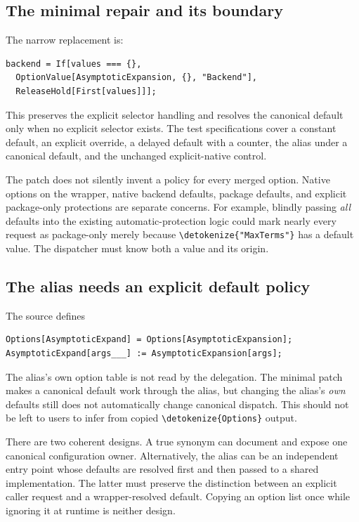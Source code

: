 \documentclass[11pt,a4paper]{article}
\newcommand{\wl}[1]{\texttt{\expandafter\nolinkurl\expandafter{\detokenize{#1}}}}
\begin{document}
\subsection{The minimal repair and its boundary}

The narrow replacement is:
\begin{lstlisting}
backend = If[values === {},
  OptionValue[AsymptoticExpansion, {}, "Backend"],
  ReleaseHold[First[values]]];
\end{lstlisting}
This preserves the explicit selector handling and resolves the canonical default
only when no explicit selector exists. The test specifications cover a constant
default, an explicit override, a delayed default with a counter, the alias under
a canonical default, and the unchanged explicit-native control.

The patch does not silently invent a policy for every merged option. Native
options on the wrapper, native backend defaults, package defaults, and explicit
package-only protections are separate concerns. For example, blindly passing
\emph{all} defaults into the existing automatic-protection logic could mark
nearly every request as package-only merely because \wl{"MaxTerms"} has a
default value. The dispatcher must know both a value and its origin.
\cite{native,nativedoc}

\subsection{The alias needs an explicit default policy}

The source defines
\begin{lstlisting}
Options[AsymptoticExpand] = Options[AsymptoticExpansion];
AsymptoticExpand[args___] := AsymptoticExpansion[args];
\end{lstlisting}
The alias's own option table is not read by the delegation. The minimal patch
makes a canonical default work through the alias, but changing the alias's
\emph{own} defaults still does not automatically change canonical dispatch.
This should not be left to users to infer from copied \wl{Options} output.
\cite{native}

There are two coherent designs. A true synonym can document and expose one
canonical configuration owner. Alternatively, the alias can be an independent
entry point whose defaults are resolved first and then passed to a shared
implementation. The latter must preserve the distinction between an explicit
caller request and a wrapper-resolved default. Copying an option list once while
ignoring it at runtime is neither design.
\end{document}
